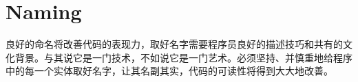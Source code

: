 \begin{savequote}[45mm]
\end{savequote}

\chapter{Naming} 
\label{ch:naming}

\begin{content}

良好的命名将改善代码的表现力，取好名字需要程序员良好的描述技巧和共有的文化背景。与其说它是一门技术，不如说它是一门艺术。必须坚持、并慎重地给程序中的每一个实体取好名字，让其名副其实，代码的可读性将得到大大地改善。

\end{content}

